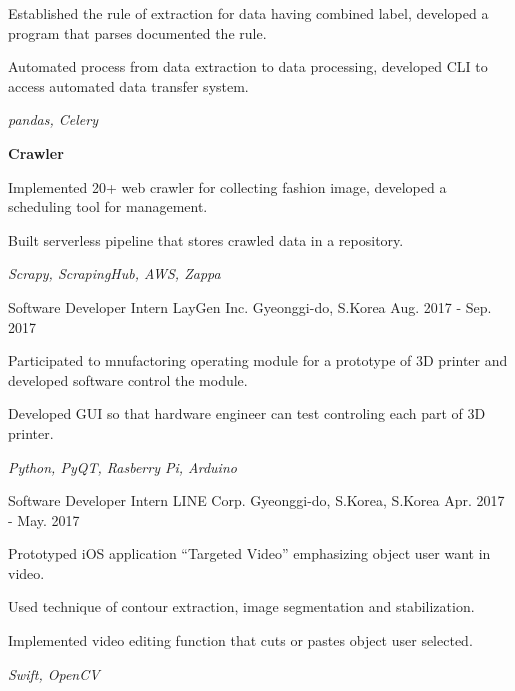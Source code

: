 \begin{cventries}
{\begin{cvitems}
        \item {Established the rule of extraction for data having combined label, developed a program that parses documented the rule.}
        \item {Automated process from data extraction to data processing, developed CLI to access automated data transfer system.}
        \item \textit{pandas, Celery}
        \item[] {\textbf{Crawler}}
        \item {Implemented 20+ web crawler for collecting fashion image, developed a scheduling tool for management.} 
        \item {Built serverless pipeline that stores crawled data in a repository.}
        \item \textit{Scrapy, ScrapingHub, AWS, Zappa}
      \end{cvitems}
    }

  \cventry
    {Software Developer Intern} %
    {LayGen Inc.} %
    {Gyeonggi-do, S.Korea} %
    {Aug. 2017 - Sep. 2017} %
    {
      \begin{cvitems} %
        \item {Participated to mnufactoring operating module for a prototype of 3D printer and developed software control the module.}
        \item {Developed GUI so that hardware engineer can test controling each part of 3D printer.}
        \item \textit{Python, PyQT, Rasberry Pi, Arduino}
      \end{cvitems}
    }

  \cventry
    {Software Developer Intern} %
    {LINE Corp.} %
    {Gyeonggi-do, S.Korea, S.Korea} %
    {Apr. 2017 - May. 2017} %
    {
      \begin{cvitems} %
        \item {Prototyped iOS application ``Targeted Video'' emphasizing object user want in video.}
        \item {Used technique of contour extraction, image segmentation and stabilization.}
        \item {Implemented video editing function that cuts or pastes object user selected.}
        \item \textit{Swift, OpenCV}
      \end{cvitems}
    }


\end{cventries}

